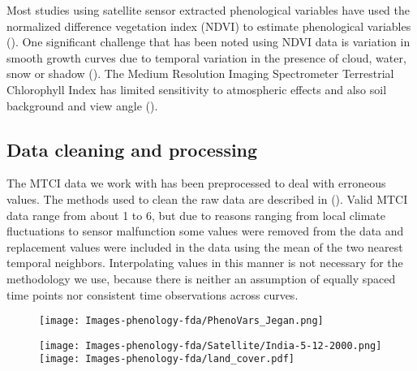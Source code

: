  Most studies using satellite sensor extracted phenological variables have used the normalized difference vegetation index (NDVI) to estimate phenological variables (\cite{Jeyaseelan:2007dh,Saikia:2009cm}). One significant challenge that has been noted using NDVI data is variation in smooth growth curves due to temporal variation in the presence of cloud, water, snow or shadow (\cite{Goward:1985hr,Huete:2002gy}). The Medium Resolution Imaging Spectrometer Terrestrial Chlorophyll Index has limited sensitivity to atmospheric effects and also soil background and view angle (\cite{Dash:2010kva}). 

\subsection{Data cleaning and processing} %
\label{sub:data_cleaning_and_processing}

The MTCI data we work with has been preprocessed to deal with erroneous values. The methods used to clean the raw data are described in (\cite{Dash:2010kva}). Valid MTCI data range from about 1 to 6, but due to reasons ranging from local climate fluctuations to sensor malfunction some values were removed from the data and replacement values were included in the data using the mean of the two nearest temporal neighbors. Interpolating values in this manner is not necessary for the methodology we use, because there is neither an assumption of equally spaced time points nor consistent time observations across curves.


\begin{figure}
	[htbp] \centering 
	\texttt{[image: Images-phenology-fda/PhenoVars\_Jegan.png]}  \label{fig:phenology diagram} 
\end{figure}



\begin{figure}
	[htbp] 
	\hspace{1.5cm}\texttt{[image: Images-phenology-fda/Satellite/India-5-12-2000.png]}   \\
	\texttt{[image: Images-phenology-fda/land\_cover.pdf]}  \label{fig:land cover} 
\end{figure}

